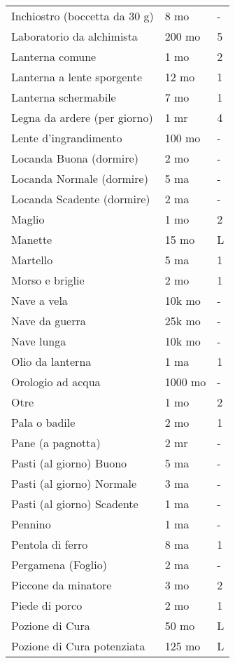 \documentclass[12pt,a4paper,twoside,openany]{book}
\begin{document}
\begin{multicols}{2}
{\begin{tabularx}{0.42\textwidth}{lll}
Inchiostro (boccetta da 30 g)& 8 mo& - \\
Laboratorio da alchimista& 200 mo  & 5\\
Lanterna comune& 1 mo& 2 \\
Lanterna a lente sporgente  & 12 mo  & 1 \\
Lanterna schermabile& 7 mo& 1 \\
Legna da ardere (per giorno)& 1 mr& 4 \\
Lente d'ingrandimento & 100 mo & -\\
Locanda Buona (dormire) & 2 mo& -\\
Locanda Normale (dormire)& 5 ma& -\\
Locanda Scadente (dormire) & 2 ma& -\\
Maglio& 1 mo& 2 \\
Manette & 15 mo  & L \\
Martello& 5 ma& 1  \\
Morso e briglie & 2 mo&1\\
Nave a vela & 10k mo & -\\
Nave da guerra  & 25k mo  & -\\
Nave lunga  & 10k mo & -\\
Olio da lanterna& 1 ma& 1 \\
Orologio ad acqua & 1000 mo & -\\
Otre  & 1 mo& 2 \\
Pala o badile & 2 mo& 1 \\
Pane (a pagnotta) & 2 mr& -\\
Pasti (al giorno) Buono & 5 ma&-\\
Pasti (al giorno) Normale& 3 ma&-\\
Pasti (al giorno) Scadente  & 1 ma&-\\
Pennino & 1 ma& - \\
Pentola di ferro  & 8 ma& 1 \\
Pergamena (Foglio)  & 2 ma& - \\
Piccone da minatore & 3 mo& 2 \\
Piede di porco& 2 mo& 1 \\
Pozione di Cura & 50 mo & L\\
Pozione di Cura potenziata & 125 mo & L\\
\end{tabularx}


}
\end{multicols}
\end{document}
